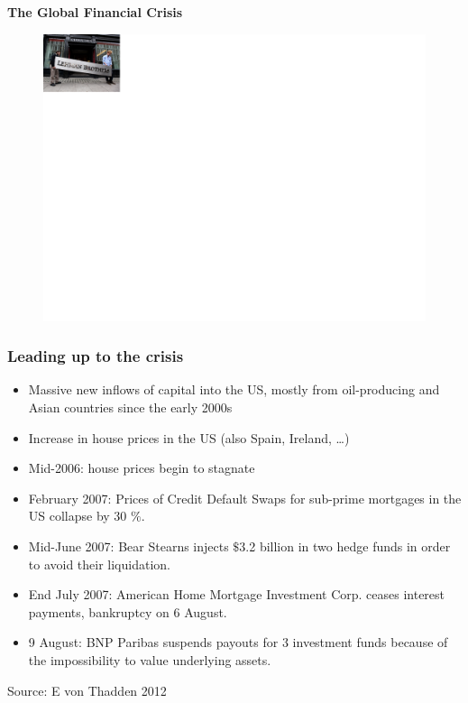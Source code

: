 \documentclass[11pt]{beamer}
\begin{document}
\begin{frame}
\begin{center}
  {\Large \textbf{The Global Financial Crisis}}
\end{center}
\end{frame}

\begin{frame}
  \begin{figure}
    \begin{center}
      \includegraphics[width=5\textwidth]{Figures/Lehman.png}
    \end{center}
  \end{figure}
\end{frame}

\begin{frame}
\frametitle{Leading up to the crisis}
\begin{itemize}
\item Massive new inflows of capital into the US, mostly from oil-producing and Asian countries since the early 2000s
\item Increase in house prices in the US (also Spain,
Ireland, …)
\item Mid-2006: house prices begin to stagnate
\item February 2007: Prices of Credit Default Swaps for sub-prime
mortgages in the US collapse by 30 $\%$.
\item Mid-June 2007: Bear Stearns injects $\$$3.2 billion in two hedge funds in order to avoid their liquidation.
\item End July 2007: American Home Mortgage Investment Corp. ceases
interest payments, bankruptcy on 6 August.
\item 9 August: BNP Paribas suspends payouts for 3 investment funds
because of the impossibility to value underlying assets.
\end{itemize}
\tiny{Source: E von Thadden 2012}
\end{frame}
\end{document}
